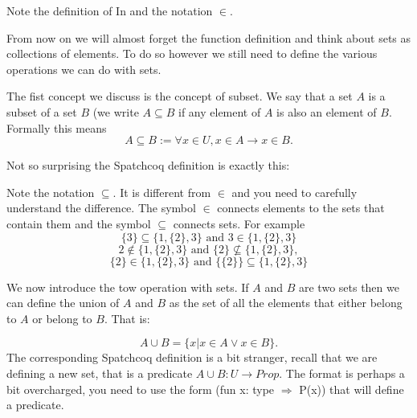 
Note the definition of In and the notation $\in$.


From now on we will almost forget the function definition and think about sets as collections of elements. To do so however we still need to define the various operations we can do with sets. 

The fist concept we discuss is the concept of subset. We say that a set $A$ is a subset of a set $B$ (we write $A\subseteq B$ if any element of $A$ is also an element of $B$. Formally this means
$$A \subseteq B := \forall x \in U, x \in A \rightarrow x \in B.$$

Not so surprising the Spatchcoq definition is exactly this:


Note the notation $\subseteq$. It is different from $\in$ and you need to carefully understand the difference. The symbol $\in$ connects elements to the sets that contain them and the symbol $\subseteq$ connects sets. For example
$$\{ 3\}\subseteq \{1, \{2\},3\}\mbox{ and }3 \in   \{1, \{2\},3\}$$ $$ 2\not\in  \{1, \{2\},3\} \mbox{ and } \{2\} \not\subseteq  \{1, \{2\},3\}, $$ $$\{2\} \in  \{1, \{2\},3\}\mbox{ and } \{\{2\}\} \subseteq  \{1, \{2\},3\}$$


We now introduce the tow operation with sets. If $A$ and $B$ are two sets then we can define the union of $A$ and $B$ as the set of all the elements that either belong to  $A$ or belong to  $B$. That is:

$$A\cup B =\{x | x \in A \lor x \in B\}.$$
The corresponding Spatchcoq definition is a bit stranger, recall that we are defining a new set, that is a predicate $A\cup B : U\rightarrow Prop$. The format is perhaps a bit overcharged, you need to use the form (fun x: type  $\Rightarrow$ P(x))  that will define a predicate.

